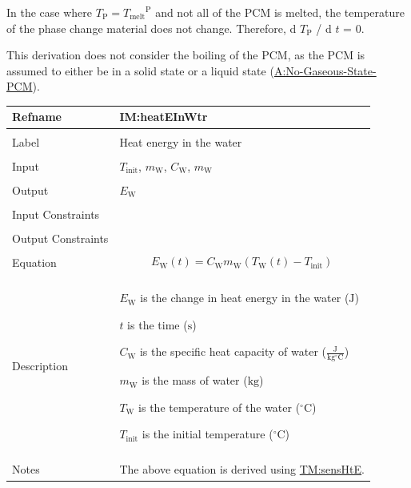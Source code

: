 \documentclass[12pt]{article}
\begin{document}
In the case where ${T_{\text{P}}}={{T_{\text{melt}}}^{\text{P}}}$ and not all of the PCM is melted, the temperature of the phase change material does not change. Therefore, d ${T_{\text{P}}}$ / d $t$ = 0.

This derivation does not consider the boiling of the PCM, as the PCM is assumed to either be in a solid state or a liquid state (\hyperref[assumpNGSP]{A:No-Gaseous-State-PCM}).

\vspace{\baselineskip}
\noindent
\begin{minipage}{\textwidth}
\begin{tabular}{>{\raggedright}p{}>{\raggedright\arraybackslash}p{}}
\toprule \textbf{Refname} & \textbf{IM:heatEInWtr}
\label{IM:heatEInWtr}
\\ \midrule \\
Label & Heat energy in the water
        
\\ \midrule \\
Input & ${T_{\text{init}}}$, ${m_{\text{W}}}$, ${C_{\text{W}}}$, ${m_{\text{W}}}$
        
\\ \midrule \\
Output & ${E_{\text{W}}}$
         
\\ \midrule \\
Input Constraints & 
\\ \midrule \\
Output Constraints & 
\\ \midrule \\
Equation & \begin{displaymath}
           {E_{\text{W}}}\left(t\right)={C_{\text{W}}} {m_{\text{W}}} \left({T_{\text{W}}}\left(t\right)-{T_{\text{init}}}\right)
           \end{displaymath}
\\ \midrule \\
Description & \begin{symbDescription}
              \item{${E_{\text{W}}}$ is the change in heat energy in the water (${\text{J}}$)}
              \item{$t$ is the time (${\text{s}}$)}
              \item{${C_{\text{W}}}$ is the specific heat capacity of water ($\frac{\text{J}}{\text{kg}{}^{\circ}\text{C}}$)}
              \item{${m_{\text{W}}}$ is the mass of water (${\text{kg}}$)}
              \item{${T_{\text{W}}}$ is the temperature of the water (${{}^{\circ}\text{C}}$)}
              \item{${T_{\text{init}}}$ is the initial temperature (${{}^{\circ}\text{C}}$)}
              \end{symbDescription}
\\ \midrule \\
Notes & The above equation is derived using \hyperref[TM:sensHtE]{TM:sensHtE}.
        

\end{tabular}
\end{minipage}
\end{document}
